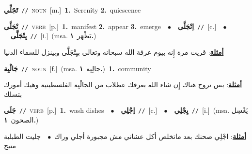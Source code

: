 \documentclass[10pt,a4paper,twoside]{article} %
\begin{document}
\begin{multicols}{2}
{\setlength\topsep{0pt}\textbf{\foreignlanguage{arabic}{تَجَلِّي}}\ {\color{gray}\texttt{//}\color{black}}\ \textsc{noun}\ [m.]\ \textbf{1.}~Serenity  \textbf{2.}~quiescence\ } \vspace{2mm}

{\setlength\topsep{0pt}\textbf{\foreignlanguage{arabic}{تْجَلَّى}}\ {\color{gray}\texttt{//}\color{black}}\ \textsc{verb}\ [p.]\ \textbf{1.}~manifest  \textbf{2.}~appear  \textbf{3.}~emerge\ \ $\bullet$\ \ \setlength\topsep{0pt}\textbf{\foreignlanguage{arabic}{اِتْجَلَّى}}\ {\color{gray}\texttt{//}\color{black}}\ [c.]\ \ $\bullet$\ \ \setlength\topsep{0pt}\textbf{\foreignlanguage{arabic}{يِتْجَلَّى}}\ {\color{gray}\texttt{//}\color{black}}\ [i.]\ \color{gray}(msa. \foreignlanguage{arabic}{يَظْهَر}~\foreignlanguage{arabic}{\textbf{١.}})\color{black}\  \begin{flushright}\color{gray}\foreignlanguage{arabic}{\textbf{\underline{\foreignlanguage{arabic}{أمثلة}}}: قريت مرة إِنه بيوم عرفة الله سبحانه وتعالى بيِتْجَلَّى وبينزل للسماء الدنيا}\end{flushright}\color{black}} \vspace{2mm}

{\setlength\topsep{0pt}\textbf{\foreignlanguage{arabic}{جَالْيِة}}\ {\color{gray}\texttt{//}\color{black}}\ \textsc{noun}\ [f.]\ \color{gray}(msa. \foreignlanguage{arabic}{جالِيِة}~\foreignlanguage{arabic}{\textbf{١.}})\color{black}\ \textbf{1.}~community\  \begin{flushright}\color{gray}\foreignlanguage{arabic}{\textbf{\underline{\foreignlanguage{arabic}{أمثلة}}}: بس تروح هناك إِن شاء الله بعرفك عطلاب من الجالْيِة الفلسطينية وهيك أمورك بتسلك}\end{flushright}\color{black}} \vspace{2mm}

{\setlength\topsep{0pt}\textbf{\foreignlanguage{arabic}{جَلَى}}\ {\color{gray}\texttt{//}\color{black}}\ \textsc{verb}\ [p.]\ \textbf{1.}~wash dishes\ \ $\bullet$\ \ \setlength\topsep{0pt}\textbf{\foreignlanguage{arabic}{اِجْلِي}}\ {\color{gray}\texttt{//}\color{black}}\ [c.]\ \ $\bullet$\ \ \setlength\topsep{0pt}\textbf{\foreignlanguage{arabic}{يِجْلِي}}\ {\color{gray}\texttt{//}\color{black}}\ [i.]\ \color{gray}(msa. \foreignlanguage{arabic}{يَغْسِل الصحون}~\foreignlanguage{arabic}{\textbf{١.}})\color{black}\  \begin{flushright}\color{gray}\foreignlanguage{arabic}{\textbf{\underline{\foreignlanguage{arabic}{أمثلة}}}: اجْلِي صحنك بعد ماتخلص أكل عشاني مش مجبورة أجلي وراك\ $\bullet$\ \  جليت الطبلية منيح}\end{flushright}\color{black}} \vspace{2mm}


\end{multicols}
\end{document}
